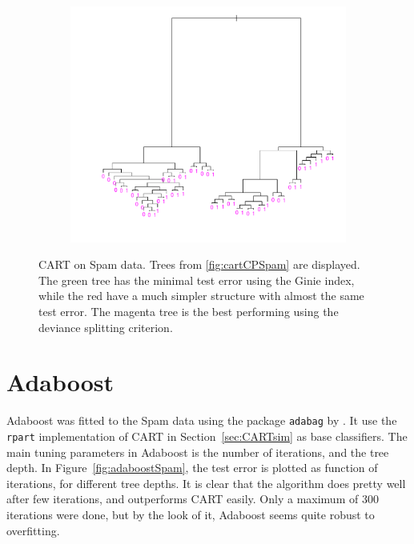 \begin{figure}[htb]
\begin{subfigure}[b]{0.48\textwidth}
  \end{subfigure}
  \quad
  \begin{subfigure}[b]{0.48\textwidth}
    \includegraphics[width=\textwidth]{./figures/cartOptDevianceSpam.pdf}
  \end{subfigure}
  \vspace{1\baselineskip}
  \caption{CART on Spam data. Trees from \ref{fig:cartCPSpam} are displayed. The green tree has the minimal test error using the Ginie index, while the red have a much simpler structure with almost the same test error. The magenta tree is the best performing using the deviance splitting criterion.}
  \label{fig:CartSpam}
\end{figure}



\section{Adaboost}
\label{sec:SimAdaBoost}
Adaboost was fitted to the Spam data using the package \verb+adabag+ by \cite{adabag}. It use the \verb+rpart+ implementation of CART in Section~\ref{sec:CARTsim} as base classifiers. The main tuning parameters in Adaboost is the number of iterations, and the tree depth. In Figure~\ref{fig:adaboostSpam}, the test error is plotted as function of iterations, for different tree depths. It is clear that the algorithm does pretty well after few iterations, and outperforms CART easily. Only a maximum of 300 iterations were done, but by the look of it, Adaboost seems quite robust to overfitting. 

